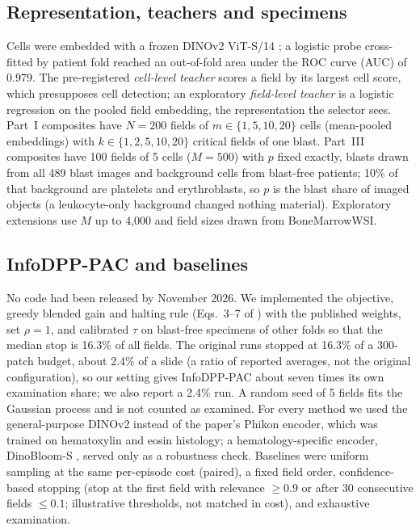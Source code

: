 \documentclass[journal]{IEEEtran}
\begin{document}
\subsection{Representation, teachers and specimens}
Cells were embedded with a frozen DINOv2 ViT-S/14 \cite{oquab2023dinov2}; a logistic probe cross-fitted by patient fold reached an out-of-fold area under the ROC curve (AUC) of 0.979. The pre-registered \emph{cell-level teacher} scores a field by its largest cell score, which presupposes cell detection; an exploratory \emph{field-level teacher} is a logistic regression on the pooled field embedding, the representation the selector sees. Part~I composites have $N=200$ fields of $m\in\{1,5,10,20\}$ cells (mean-pooled embeddings) with $k\in\{1,2,5,10,20\}$ critical fields of one blast. Part~III composites have 100 fields of 5 cells ($M=500$) with $p$ fixed exactly, blasts drawn from all 489 blast images and background cells from blast-free patients; 10\% of that background are platelets and erythroblasts, so $p$ is the blast share of imaged objects (a leukocyte-only background changed nothing material). Exploratory extensions use $M$ up to 4,000 and field sizes drawn from BoneMarrowWSI.

\subsection{InfoDPP-PAC and baselines}
No code had been released by November 2026. We implemented the objective, greedy blended gain and halting rule (Eqs.~3--7 of \cite{mittal2026infodpp}) with the published weights, set $\rho=1$, and calibrated $\tau$ on blast-free specimens of other folds so that the median stop is 16.3\% of all fields. The original runs stopped at 16.3\% of a 300-patch budget, about 2.4\% of a slide (a ratio of reported averages, not the original configuration), so our setting gives InfoDPP-PAC about seven times its own examination share; we also report a 2.4\% run. A random seed of 5 fields fits the Gaussian process and is not counted as examined. For every method we used the general-purpose DINOv2 instead of the paper's Phikon encoder, which was trained on hematoxylin and eosin histology; a hematology-specific encoder, DinoBloom-S \cite{koch2024dinobloom}, served only as a robustness check. Baselines were uniform sampling at the same per-episode cost (paired), a fixed field order, confidence-based stopping (stop at the first field with relevance $\ge0.9$ or after 30 consecutive fields $\le0.1$; illustrative thresholds, not matched in cost), and exhaustive examination.
\end{document}

